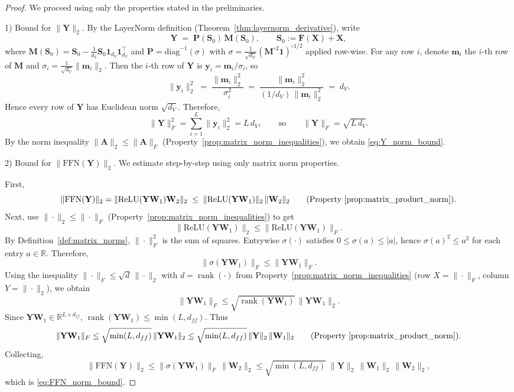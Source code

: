 \documentclass{article}
\begin{document}
\begin{proof}
We proceed using only the properties stated in the preliminaries.

1) Bound for $\|\mathbf{Y}\|_2$.
By the LayerNorm definition (Theorem~\ref{thm:layernorm_derivative}), write
\[\mathbf{Y} \;=\; \mathbf{P}(\mathbf{S}_0)\,\mathbf{M}(\mathbf{S}_0), \qquad \mathbf{S}_0:=\mathbf{F}(\mathbf{X})+\mathbf{X},\]
where $\mathbf{M}(\mathbf{S}_0)=\mathbf{S}_0-\tfrac{1}{d_V}\mathbf{S}_0\mathbf{1}_{d_V}\mathbf{1}_{d_V}^\top$ and 
$\mathbf{P}=\mathrm{diag}^{-1}(\sigma)$ with $\sigma=\tfrac{1}{\sqrt{d_V}}(\mathbf{M}^{\circ 2}\mathbf{1})^{\circ 1/2}$ applied row-wise.
For any row $i$, denote $\mathbf{m}_i$ the $i$-th row of $\mathbf{M}$ and $\sigma_i=\tfrac{1}{\sqrt{d_V}}\|\mathbf{m}_i\|_2$. Then the $i$-th row of $\mathbf{Y}$ is $\mathbf{y}_i=\mathbf{m}_i/\sigma_i$, so
\[\|\mathbf{y}_i\|_2^2 \;=\; \frac{\|\mathbf{m}_i\|_2^2}{\sigma_i^2}\;=\; \frac{\|\mathbf{m}_i\|_2^2}{(1/d_V)\,\|\mathbf{m}_i\|_2^2}\;=\; d_V.\]
Hence every row of $\mathbf{Y}$ has Euclidean norm $\sqrt{d_V}$. Therefore,
\[\|\mathbf{Y}\|_F^2 = \sum_{i=1}^L \|\mathbf{y}_i\|_2^2 = L\,d_V,\qquad\text{so}\qquad\|\mathbf{Y}\|_F = \sqrt{L\,d_V}.\]
By the norm inequality $\|\mathbf{A}\|_2 \le \|\mathbf{A}\|_F$ (Property~\ref{prop:matrix_norm_inequalities}), we obtain \eqref{eq:Y_norm_bound}.

2) Bound for $\|\mathrm{FFN}(\mathbf{Y})\|_2$.
We estimate step-by-step using only matrix norm properties.

First,
\[\|\mathrm{FFN}(\mathbf{Y})\|_2= \|\text{ReLU}(\mathbf{Y}\mathbf{W}_1)\mathbf{W}_2\|_2\;\le\; \|\text{ReLU}(\mathbf{Y}\mathbf{W}_1)\|_2 \,\|\mathbf{W}_2\|_2\qquad\text{(Property~\ref{prop:matrix_product_norm})}.\]
Next, use $\|\cdot\|_2 \le \|\cdot\|_F$ (Property~\ref{prop:matrix_norm_inequalities}) to get
\[\|\text{ReLU}(\mathbf{Y}\mathbf{W}_1)\|_2 \le \|\text{ReLU}(\mathbf{Y}\mathbf{W}_1)\|_F.\]
By Definition~\ref{def:matrix_norms}, $\|\cdot\|_F^2$ is the sum of squares. Entrywise $\sigma(\cdot)$ satisfies $0\le \sigma(a)\le |a|$, hence $\sigma(a)^2 \le a^2$ for each entry $a \in \mathbb{R}$. Therefore,
\[\|\sigma(\mathbf{Y}\mathbf{W}_1)\|_F \le \|\mathbf{Y}\mathbf{W}_1\|_F.\]
Using the inequality $\|\cdot\|_F \le \sqrt{d}\,\|\cdot\|_2$ with $d=\operatorname{rank}(\cdot)$ from Property~\ref{prop:matrix_norm_inequalities} (row $X=\|\cdot\|_F$, column $Y=\|\cdot\|_2$), we obtain
\[\|\mathbf{Y}\mathbf{W}_1\|_F \le \sqrt{\operatorname{rank}(\mathbf{Y}\mathbf{W}_1)}\,\|\mathbf{Y}\mathbf{W}_1\|_2.\]
Since $\mathbf{Y}\mathbf{W}_1 \in \mathbb{R}^{L\times d_{ff}}$, $\operatorname{rank}(\mathbf{Y}\mathbf{W}_1)\le \min(L,d_{ff})$. Thus
\[\|\mathbf{Y}\mathbf{W}_1\|_F \le \sqrt{\min(L,d_{ff})}\,\|\mathbf{Y}\mathbf{W}_1\|_2\le \sqrt{\min(L,d_{ff})}\,\|\mathbf{Y}\|_2 \,\|\mathbf{W}_1\|_2\qquad\text{(Property~\ref{prop:matrix_product_norm})}.\]
Collecting,
\[\|\mathrm{FFN}(\mathbf{Y})\|_2\le \|\sigma(\mathbf{Y}\mathbf{W}_1)\|_F \,\|\mathbf{W}_2\|_2\le \sqrt{\min(L,d_{ff})}\;\|\mathbf{Y}\|_2\,\|\mathbf{W}_1\|_2\,\|\mathbf{W}_2\|_2,\]
which is \eqref{eq:FFN_norm_bound}.


\end{proof}
\end{document}
